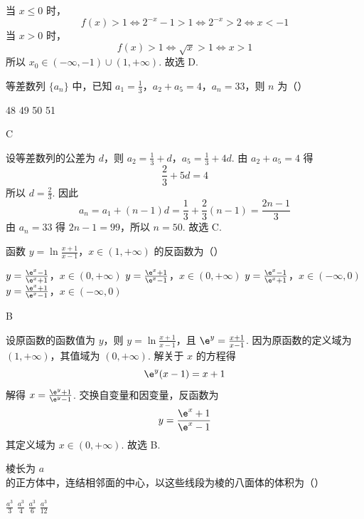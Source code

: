 \begin{solution}
当 \(x\leqslant0\) 时，
\[
f(x)>1\Longleftrightarrow 2^{-x}-1>1
\Longleftrightarrow 2^{-x}>2
\Longleftrightarrow x<-1
\]
当 \(x>0\) 时，
\[
f(x)>1\Longleftrightarrow \sqrt{x}>1
\Longleftrightarrow x>1
\]
所以 \(x_0\in(-\infty,-1)\cup(1,+\infty)\). 故选 D.
\end{solution}

\begin{problem}
等差数列 \(\{a_n\}\) 中，已知 \(a_1 = \frac{1}{3}\)，\(a_2 + a_5 = 4\)，\(a_n = 33\)，则 \(n\) 为（\quad）

\choices
    {48}
    {49}
    {50}
    {51}
\end{problem}

\begin{answer}
C
\end{answer}

\begin{solution}
设等差数列的公差为 \(d\)，则 \(a_2=\frac13+d\)，\(a_5=\frac13+4d\).
由 \(a_2+a_5=4\) 得
\[
\frac23+5d=4
\]
所以 \(d=\frac23\).
因此
\[
a_n=a_1+(n-1)d=\frac13+\frac23(n-1)=\frac{2n-1}{3}
\]
由 \(a_n=33\) 得 \(2n-1=99\)，所以 \(n=50\). 故选 C.
\end{solution}

\begin{problem}
函数 \(y = \ln \frac{x + 1}{x - 1}\)，\(x \in (1, +\infty)\) 的反函数为（\quad）

\choices
    {\( y = \frac{\e^{x} - 1}{\e^{x} + 1}\)，\(x \in (0, +\infty)\)}
    {\(y = \frac{\e^{x} + 1}{\e^{x} - 1}\)，\(x \in (0, +\infty)\)}
    {\(y = \frac{\e^{x} - 1}{\e^{x} + 1}\)，\(x \in (-\infty, 0)\)}
    {\(y = \frac{\e^{x} + 1}{\e^{x} - 1}\)，\(x \in (-\infty, 0)\)}
\end{problem}

\begin{answer}
B
\end{answer}

\begin{solution}
设原函数的函数值为 \(y\)，则 \(y=\ln\frac{x+1}{x-1}\)，且 \(\e^y=\frac{x+1}{x-1}\).
因为原函数的定义域为 \((1,+\infty)\)，其值域为 \((0,+\infty)\). 解关于 \(x\) 的方程得
\[
\e^y(x-1)=x+1
\]
解得 \(x=\frac{\e^y+1}{\e^y-1}\).
交换自变量和因变量，反函数为
\[
y=\frac{\e^x+1}{\e^x-1}
\]
其定义域为 \(x\in(0,+\infty)\).
故选 B.
\end{solution}

\begin{problem}
棱长为 \(a\) 的正方体中，连结相邻面的中心，以这些线段为棱的八面体的体积为（\quad）

\choices
    {\(\frac{a^3}{3}\)}
    {\(\frac{a^3}{4}\)}
    {\(\frac{a^3}{6}\)}
    {\(\frac{a^3}{12}\)}
\end{problem}

